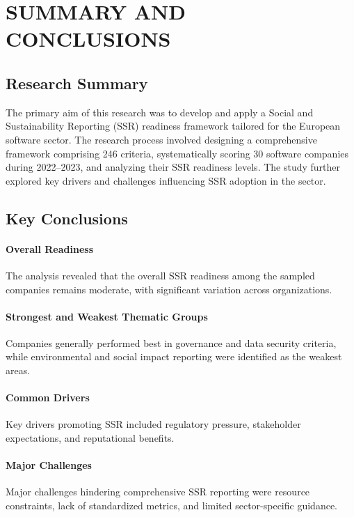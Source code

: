 \chapter{SUMMARY AND CONCLUSIONS}

\section{Research Summary}
The primary aim of this research was to develop and apply a Social and Sustainability Reporting (SSR) readiness framework tailored for the European software sector. The research process involved designing a comprehensive framework comprising 246 criteria, systematically scoring 30 software companies during 2022--2023, and analyzing their SSR readiness levels. The study further explored key drivers and challenges influencing SSR adoption in the sector.

\section{Key Conclusions}
\subsubsection{Overall Readiness}
The analysis revealed that the overall SSR readiness among the sampled companies remains moderate, with significant variation across organizations.

\subsubsection{Strongest and Weakest Thematic Groups}
Companies generally performed best in governance and data security criteria, while environmental and social impact reporting were identified as the weakest areas.

\subsubsection{Common Drivers}
Key drivers promoting SSR included regulatory pressure, stakeholder expectations, and reputational benefits.

\subsubsection{Major Challenges}
Major challenges hindering comprehensive SSR reporting were resource constraints, lack of standardized metrics, and limited sector-specific guidance.

